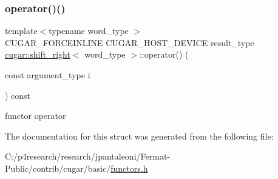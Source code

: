 \subsubsection{\texorpdfstring{operator()()}{operator()()}}
{\footnotesize\ttfamily template$<$typename word\+\_\+type $>$ \\
C\+U\+G\+A\+R\+\_\+\+F\+O\+R\+C\+E\+I\+N\+L\+I\+NE C\+U\+G\+A\+R\+\_\+\+H\+O\+S\+T\+\_\+\+D\+E\+V\+I\+CE result\+\_\+type \hyperlink{structcugar_1_1shift__right}{cugar\+::shift\+\_\+right}$<$ word\+\_\+type $>$\+::operator() (\begin{DoxyParamCaption}\item[{const argument\+\_\+type}]{i }\end{DoxyParamCaption}) const\hspace{0.3cm}{\ttfamily [inline]}}

functor operator 

The documentation for this struct was generated from the following file\+:\begin{DoxyCompactItemize}
\item 
C\+:/p4research/research/jpantaleoni/\+Fermat-\/\+Public/contrib/cugar/basic/\hyperlink{functors_8h}{functors.\+h}\end{DoxyCompactItemize}
